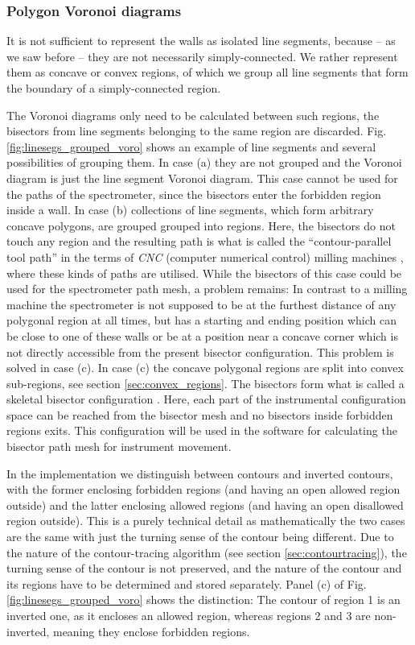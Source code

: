 \subsubsection*{Polygon Voronoi diagrams}
\label{sec:polygonal_voronoi_diagram}

It is not sufficient to represent the walls as isolated line segments, because -- 
as we saw before -- they are not necessarily simply-connected. 
We rather represent them as concave or convex regions, of which we group all 
line segments that form the boundary of a simply-connected region.

The Voronoi diagrams only need to be calculated between such regions, 
the bisectors from line segments belonging to the same region are discarded. 
Fig. \ref{fig:linesegs_grouped_voro} shows an example of line segments and several
possibilities of grouping them. 
In case (a) they are not grouped and the Voronoi diagram is just the line 
segment Voronoi diagram. This case cannot be used for the paths of the spectrometer,
since the bisectors enter the forbidden region inside a wall.
In case (b) collections of line segments, which form arbitrary concave polygons, 
are grouped grouped into regions. Here, the bisectors do not touch any region 
and the resulting path is what is called the ``contour-parallel tool path'' in 
the terms of \textit{CNC} (computer numerical control) milling machines \cite{Jeong1998, wiki_milling}, 
where these kinds of paths are utilised. While the bisectors of this case could 
be used for the spectrometer path mesh, a problem remains: In contrast to a milling
machine the spectrometer is not supposed to be at the furthest distance of any
polygonal region at all times, but has a starting and ending position which can 
be close to one of these walls or be at a position near a concave corner which
is not directly accessible from the present bisector configuration. This problem
is solved in case (c).
In case (c) the concave polygonal regions are split into convex sub-regions, see
section \ref{sec:convex_regions}.
The bisectors form what is called a skeletal bisector configuration \cite{Jeong1998, Couprie2007}.
Here, each part of the instrumental configuration space can be reached from the
bisector mesh and no bisectors inside forbidden regions exits. This configuration
will be used in the software for calculating the bisector path mesh for instrument
movement.

In the implementation we distinguish between contours and inverted contours, with 
the former enclosing forbidden regions (and having an open allowed region outside) 
and the latter enclosing allowed regions (and having an open disallowed region outside).
This is a purely technical detail as mathematically the two cases are the same
with just the turning sense of the contour being different. 
Due to the nature of the contour-tracing algorithm (see section \ref{sec:contourtracing}), 
the turning sense of the contour is not preserved, and the nature of the contour 
and its regions have to be determined and stored separately.
Panel (c) of Fig. \ref{fig:linesegs_grouped_voro} shows the distinction: 
The contour of region 1 is an inverted one, as it encloses an allowed region,
whereas regions 2 and 3 are non-inverted, meaning they enclose forbidden regions.


